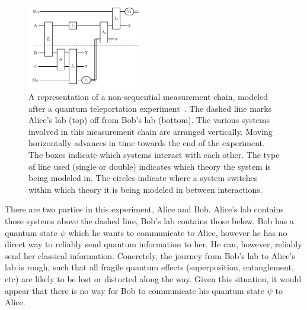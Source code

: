 \documentclass[prd,twocolumn,superscriptaddress,floatfix,amsmath,amssymb,amsfonts,nofootinbib]{revtex4-2}
\begin{document}
\begin{figure}
\includegraphics[width=0.45\textwidth]{Figures/TeleportationChain.pdf}
\caption{A representation of a non-sequential measurement chain, modeled after a quantum teleportation experiment~\cite{Nielsen2000}. The dashed line marks Alice's lab (top) off from Bob's lab (bottom). The various systems involved in this measurement chain are arranged vertically. Moving horizontally advances in time towards the end of the experiment. The boxes indicate which systems interact with each other. The type of line used (single or double) indicates which theory the system is being modeled in. The circles indicate where a system switches within which theory it is being modeled in between interactions.}\label{FigChain2}
\end{figure}

There are two parties in this experiment, Alice and Bob. Alice's lab contains those systems above the dashed line, Bob's lab contains those below. Bob has a quantum state $\psi$ which he wants to communicate to Alice, however he has no direct way to reliably send quantum information to her. He can, however, reliably send her classical information. Concretely, the journey from Bob's lab to Alice's lab is rough, such that all fragile quantum effects (superposition, entanglement, etc) are likely to be lost or distorted along the way. Given this situation, it would appear that there is no way for Bob to communicate his quantum state $\psi$ to Alice.
\end{document}
